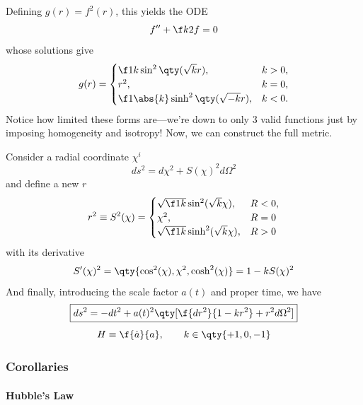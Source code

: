 Defining $g(r)=f^2(r)$, this yields the ODE
\begin{equation}
    f''+\f k2 f=0
\end{equation}
whose solutions give
\begin{equation}
    g(r)=\begin{cases}
        \f1k \sin^2\qty(\sqrt{k}r), & k>0,\\
        r^2, & k=0,\\
        \f1{\abs{k}}\sinh^2\qty(\sqrt{-k}r), & k<0.
    \end{cases}
\end{equation}
Notice how limited these forms are—we're down to only 3 valid functions just by imposing homogeneity and isotropy! Now, we can construct the full metric.

Consider a radial coordinate $\chi^i$ 
\begin{equation}
    ds^2=d\chi^2+S(\chi)^2d\Omega^2
\end{equation}
and define a new $r$
\begin{equation}
    r^2\equiv S^2(\chi)=
    \begin{cases}
        \sqrt{\f1k}\sin^2(\sqrt{k}\chi), &R<0,\\
        \chi^2, &R=0\\
        \sqrt{\f1k}\sinh^2(\sqrt{k}\chi), & R>0
    \end{cases}
\end{equation}
with its derivative
\begin{equation}
    S'(\chi)^2=\qty{\cos^2(\chi),\chi^2,\cosh^2(\chi)}=1-kS(\chi)^2
\end{equation}
And finally, introducing the scale factor $a(t)$ and proper time, we have
\begin{equation}
    \label{eq:thefinalmetric}\boxed{ds^2=-dt^2+a(t)^2\qty[\f{dr^2}{1-kr^2}+r^2d\Omega^2]}
\end{equation}
\[
H\equiv\f{\dot{a}}{a}, \qquad k\in\qty{+1,0,-1}
\]


\subsubsection{Corollaries}

\paragraph{Hubble's Law}

